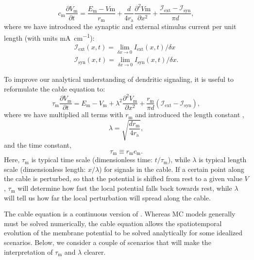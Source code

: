 \begin{equation}
c_\text{m} \frac{\partial V_\mathrm{m}}{\partial t} = \frac{E_\text{m}-V\mathrm{m}}{r_\text{m}} +  \frac{d}{4 r_\text{a}}  \frac{\partial^2 V\mathrm{m}}{\partial x^2} +  \frac{\mathcal{I}_{\mathrm{ext}}-\mathcal{I}_{\mathrm{syn}}}{\pi d},
\label{eq:Neuron:cable}
\end{equation}
where we have introduced the synaptic and external stimulus current per unit length (with units  \si{\milli\ampere\per\centi\metre}):
\begin{eqnarray}
\mathcal{I}_{\mathrm{ext}}(x,t) = \lim_{\delta x \to 0} I_{\mathrm{ext}}(x,t)/\delta x
\nonumber \\
\mathcal{I}_{\mathrm{syn}}(x,t) = \lim_{\delta x \to 0} I_{\mathrm{syn}}(x,t)/\delta x.
\label{eq:Neuron:CurrentPerUnitLength}
\end{eqnarray}

To improve our analytical understanding of dendritic signaling, it is useful to reformulate the cable equation to:
\begin{equation}
\tau_\text{m} \frac{\partial V_\mathrm{m}}{\partial t} = E_\mathrm{m}-V_\mathrm{m} +   \lambda^2  \frac{\partial^2 V_\mathrm{m}}{\partial x^2}  + \frac{r_\mathrm{m}}{\pi d} \left( \mathcal{I}_{\mathrm{ext}} - \mathcal{I}_{\mathrm{syn}}\right),
\label{eq:Neuron:cable2}
\end{equation}
where we have multiplied all terms with $r_\text{m}$ and introduced the length constant ,
\begin{equation}
\lambda = \sqrt{\frac{d r_\text{m}}{4 r_\text{a}}}, 
\label{eq:Neuron:lengthconst}
\end{equation}
and the time constant, 
\begin{equation}
\tau_\text{m} \equiv r_\text{m} c_\text{m}.
\label{eq:Neuron:timeconst}
\end{equation}
Here, $\tau_\mathrm{m}$ is typical time scale (dimensionless time: $t/\tau_\mathrm{m}$), while $\lambda$  is typical length scale  (dimensionless length: $x/\lambda$) for signals in the cable. If a certain point along the cable is perturbed, so that the potential is shifted from rest to a given value $V$, $\tau_\text{m}$ will determine how fast the local potential falls back towards rest, while $\lambda$ will tell us how far the local perturbation will spread along the cable. 

The cable equation is a continuous version of . Whereas MC models generally must be solved numerically, the cable equation allows the spatiotemporal evolution of the membrane potential to be solved analytically for some idealized scenarios. Below, we consider a couple of scenarios that will  make the interpretation of $\tau_\text{m}$ and $\lambda$ clearer. 


